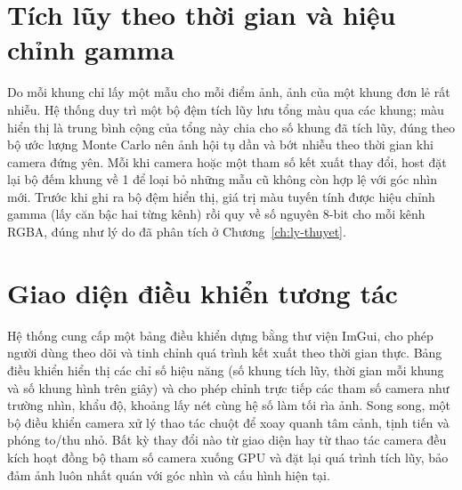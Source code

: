 \section{Tích lũy theo thời gian và hiệu chỉnh gamma}
Do mỗi khung chỉ lấy một mẫu cho mỗi điểm ảnh, ảnh của một khung đơn lẻ rất nhiễu.
Hệ thống duy trì một bộ đệm tích lũy lưu tổng màu qua các khung; màu hiển thị là
trung bình cộng của tổng này chia cho số khung đã tích lũy, đúng theo bộ ước lượng
Monte Carlo nên ảnh hội tụ dần và bớt nhiễu theo thời gian khi camera đứng yên.
Mỗi khi camera hoặc một tham số kết xuất thay đổi, host đặt lại bộ đếm khung về 1
để loại bỏ những mẫu cũ không còn hợp lệ với góc nhìn mới. Trước khi ghi ra bộ đệm
hiển thị, giá trị màu tuyến tính được hiệu chỉnh gamma (lấy căn bậc hai từng kênh)
rồi quy về số nguyên 8-bit cho mỗi kênh RGBA, đúng như lý do đã phân tích ở
Chương~\ref{ch:ly-thuyet}.

\section{Giao diện điều khiển tương tác}
Hệ thống cung cấp một bảng điều khiển dựng bằng thư viện ImGui, cho phép người
dùng theo dõi và tinh chỉnh quá trình kết xuất theo thời gian thực. Bảng điều
khiển hiển thị các chỉ số hiệu năng (số khung tích lũy, thời gian mỗi khung và số
khung hình trên giây) và cho phép chỉnh trực tiếp các tham số camera như trường
nhìn, khẩu độ, khoảng lấy nét cùng hệ số làm tối rìa ảnh. Song song, một bộ điều
khiển camera xử lý thao tác chuột để xoay quanh tâm cảnh, tịnh tiến và phóng
to/thu nhỏ. Bất kỳ thay đổi nào từ giao diện hay từ thao tác camera đều kích hoạt
đồng bộ tham số camera xuống GPU và đặt lại quá trình tích lũy, bảo đảm ảnh luôn
nhất quán với góc nhìn và cấu hình hiện tại.
